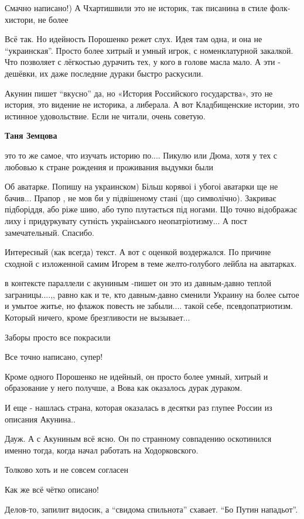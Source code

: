 \begin{itemize}
Смачно написано!) А Чхартишвили это не историк, так писанина в стиле
фолк-хистори, не более


Всё так. Но идейность Порошенко режет слух. Идея там одна, и она не
\enquote{украинская}. Просто более хитрый и умный игрок, с номенклатурной закалкой. Что
позволяет с лёгкостью дурачить тех, у кого в голове масла мало. А эти -
дешёвки, их даже последние дураки быстро раскусили.


Акунин пишет \enquote{вкусно} да, но «История Российского государства», это не история,
это видение не историка, а либерала. А вот Кладбищенские истории, это истинное
удовольствие. Если не читали, очень советую.

\textbf{Таня Земцова} 

это то же самое, что изучать историю по.... Пикулю или Дюма, хотя у тех с любовью
к стране рождения и проживания выдумки были


Об аватарке. Попишу на украинском) Більш корявоі і убогоі аватарки ще не
бачив... Прапор , не мов би у підвішеному стані (що символічно). Закриває
підборіддя, або ріже шию, або тупо плутається під ногами. Що точно відображає
лиху і придуркувату сутність украінського неопатріотизму... А пост
замечательный. Спасибо.


Интересный (как всегда) текст. А вот с оценкой воздержался. По причине сходной
с изложенной самим Игорем в теме желто-голубого лейбла на аватарках.


в контексте параллели с акуниным -пишет он это из давным-давно теплой
заграницы....,, равно как и те, кто давным-давно сменили Украину на более сытое
и умытое житье, но флажок повесть не забыли.... такой себе, псевдопатриотизм.
Который ничего, кроме брезгливости не вызывает...

Заборы просто все покрасили


Все точно написано, супер!

Кроме одного Порошенко не идейный, он просто более умный, хитрый и образование
у него получше, а Вова как оказалось дурак дураком.

И еще - нашлась страна, которая оказалась в десятки раз глупее России из
описания Акунина..

Дауж. А с Акуниным всё ясно. Он по странному совпадению оскотинился именно
тогда, когда начал работать на Ходорковского.


Толково хоть и не совсем согласен

Как же всё чётко описано!

Делов-то, запилит видосик, а \enquote{свидома спильнота} схавает. \enquote{Бо Путин нападьот}.

\end{itemize} %

